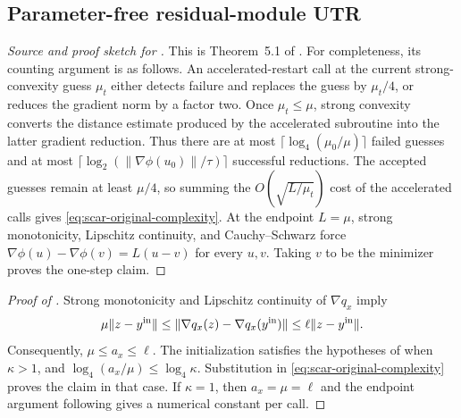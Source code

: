 \documentclass{article}
\begin{document}
\subsection{Parameter-free residual-module UTR}

\begin{proof}[Source and proof sketch for ]
This is Theorem~5.1 of \citet{lan2026optimal}.  For completeness, its
counting argument is as follows.  An accelerated-restart call at the
current strong-convexity guess $\mu_t$ either detects failure and
replaces the guess by $\mu_t/4$, or reduces the gradient norm by a
factor two.  Once $\mu_t\le\mu$, strong convexity converts the distance
estimate produced by the accelerated subroutine into the latter
gradient reduction.  Thus there are at most
$\lceil\log_4(\mu_0/\mu)\rceil$ failed guesses and at most
$\lceil\log_2(\|\nabla\phi(u_0)\|/\tau)\rceil$ successful reductions.
The accepted guesses remain at least $\mu/4$, so summing the
$O(\sqrt{L/\mu_t})$ cost of the accelerated calls gives
\eqref{eq:scar-original-complexity}.  At the endpoint $L=\mu$, strong
monotonicity, Lipschitz continuity, and Cauchy--Schwarz force
$\nabla\phi(u)-\nabla\phi(v)=L(u-v)$ for every $u,v$.  Taking $v$ to
be the minimizer proves the one-step claim.
\end{proof}

\begin{proof}[Proof of ]
Strong monotonicity and Lipschitz continuity of $\nabla q_x$ imply
\[
 \mu\|z-y^{\rm in}\|
 \le\|\nabla q_x(z)-\nabla q_x(y^{\rm in})\|
 \le\ell\|z-y^{\rm in}\|.
\]
Consequently, $\mu\le a_x\le\ell$.  The initialization satisfies the
hypotheses of  when $\kappa>1$, and
$\log_4(a_x/\mu)\le\log_4\kappa$.  Substitution in
\eqref{eq:scar-original-complexity} proves the claim in that case.  If
$\kappa=1$, then $a_x=\mu=\ell$ and the endpoint argument following
 gives a numerical constant per call.
\end{proof}
\end{document}
